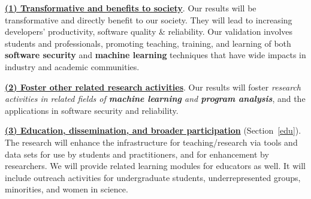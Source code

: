 \underline{{\bf (1) Transformative and benefits to society}}. Our
results will be transformative and directly benefit to our society.
They will lead to increasing developers' productivity, software
quality \& reliability.  Our validation involves students and
professionals, promoting teaching, training, and learning of both {\bf
  software security} and {\bf machine learning} techniques that
have wide impacts in industry and academic communities.

\noindent\underline{{\bf (2) Foster other related research
    activities}}. Our results will foster {\em research activities in
  related fields of {\bf machine learning} and {\bf program analysis}},
and the applications in software security and reliability.



\noindent\underline{{\bf (3) Education, dissemination, and broader participation}} (Section~\ref{edu}). The
research will enhance the infrastructure for teaching/research via
tools and data sets for use by students and practitioners, and for
enhancement by researchers. We will provide related learning
modules for educators as well. It will include outreach activities for
undergraduate students, underrepresented groups, minorities, and women
in science.


